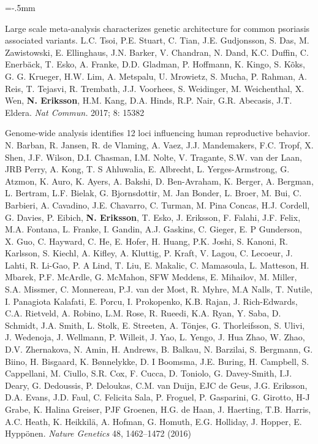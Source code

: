 \documentclass[11pt]{article}
\newenvironment{papers}[1][1]
	{\vspace{-2ex}\leftmargini=16.1mm%
	 \begin{revnumerate}[{#1}]\itemsep=-.5mm}
	{\end{revnumerate}\vspace{-2ex}}
\def\paper{\item}
\def\paperyear#1{\item[\addtocounter{enumi}{-1}%
		 {\makebox[0mm][r]{\makebox[14mm]{#1\hfill\arabic{enumi}.}}}]}
\begin{document}
\begin{papers}[46]
            \paper
        Large scale meta-analysis characterizes genetic architecture for common psoriasis associated variants.
        L.C. Tsoi, P.E. Stuart, C. Tian, J.E. Gudjonsson, S. Das, M. Zawistowski, E. Ellinghaus, J.N. Barker, V. Chandran, N. Dand, K.C. Duffin, C. Enerbäck, T. Esko, A. Franke, D.D. Gladman, P. Hoffmann, K. Kingo, S. Kõks, G. G. Krueger, H.W. Lim, A. Metspalu, U. Mrowietz, S. Mucha, P. Rahman, A. Reis, T. Tejasvi, R. Trembath, J.J. Voorhees, S. Weidinger, M. Weichenthal, X. Wen, \textbf{N. Eriksson}, H.M. Kang, D.A. Hinds, R.P. Nair, G.R. Abecasis, J.T. Eldera.
        \textit{Nat Commun.} 2017; 8: 15382

                    \paperyear{2016}
        Genome-wide analysis identifies 12 loci influencing human reproductive behavior.
        N. Barban, R. Jansen, R. de Vlaming, A. Vaez, J.J. Mandemakers, F.C. Tropf, X. Shen, J.F. Wilson, D.I. Chasman, I.M. Nolte, V. Tragante, S.W. van der Laan, JRB Perry, A. Kong, T. S Ahluwalia, E. Albrecht, L. Yerges-Armstrong, G. Atzmon, K. Auro, K. Ayers, A. Bakshi, D. Ben-Avraham, K. Berger, A. Bergman, L. Bertram, L.F. Bielak, G. Bjornsdottir, M. Jan Bonder, L. Broer, M. Bui, C. Barbieri, A. Cavadino, J.E. Chavarro, C. Turman, M. Pina Concas, H.J. Cordell, G. Davies, P. Eibich, \textbf{N. Eriksson}, T. Esko, J. Eriksson, F. Falahi, J.F. Felix, M.A. Fontana, L. Franke, I. Gandin, A.J. Gaskins, C. Gieger, E. P Gunderson, X. Guo, C. Hayward, C. He, E. Hofer, H. Huang, P.K. Joshi, S. Kanoni, R. Karlsson, S. Kiechl, A. Kifley, A. Kluttig, P. Kraft, V. Lagou, C. Lecoeur, J. Lahti, R. Li-Gao, P. A Lind, T. Liu, E. Makalic, C. Mamasoula, L. Matteson, H. Mbarek, P.F. McArdle, G. McMahon, SFW Meddens, E. Mihailov, M. Miller, S.A. Missmer, C. Monnereau, P.J. van der Most, R. Myhre, M.A Nalls, T. Nutile, I. Panagiota Kalafati, E. Porcu, I. Prokopenko, K.B. Rajan, J. Rich-Edwards, C.A. Rietveld, A. Robino, L.M. Rose, R. Rueedi, K.A. Ryan, Y. Saba, D. Schmidt, J.A. Smith, L. Stolk, E. Streeten, A. Tönjes, G. Thorleifsson, S. Ulivi, J. Wedenoja, J. Wellmann, P. Willeit, J. Yao, L. Yengo, J. Hua Zhao, W. Zhao, D.V. Zhernakova, N. Amin, H. Andrews, B. Balkau, N. Barzilai, S. Bergmann, G. Biino, H. Bisgaard, K. Bønnelykke, D. I Boomsma, J.E. Buring, H. Campbell, S. Cappellani, M. Ciullo, S.R. Cox, F. Cucca, D. Toniolo, G. Davey-Smith, I.J. Deary, G. Dedoussis, P. Deloukas, C.M. van Duijn, EJC de Geus, J.G. Eriksson, D.A. Evans, J.D. Faul, C. Felicita Sala, P. Froguel, P. Gasparini, G. Girotto, H-J Grabe, K. Halina Greiser, PJF Groenen, H.G. de Haan, J. Haerting, T.B. Harris, A.C. Heath, K. Heikkilä, A. Hofman, G. Homuth, E.G. Holliday, J. Hopper, E. Hyppönen.
        \textit{Nature Genetics} 48, 1462–1472 (2016)


\end{papers}
\end{document}
